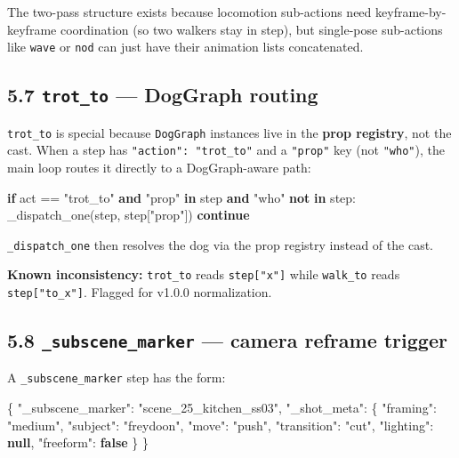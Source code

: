 \documentclass[
  11pt,
]{book}
\newenvironment{Shaded}{}{}
\newcommand{\ControlFlowTok}[1]{\textcolor[rgb]{0.00,0.44,0.13}{\textbf{#1}}}
\newcommand{\DataTypeTok}[1]{\textcolor[rgb]{0.56,0.13,0.00}{#1}}
\newcommand{\FunctionTok}[1]{\textcolor[rgb]{0.02,0.16,0.49}{#1}}
\newcommand{\KeywordTok}[1]{\textcolor[rgb]{0.00,0.44,0.13}{\textbf{#1}}}
\newcommand{\NormalTok}[1]{#1}
\newcommand{\OperatorTok}[1]{\textcolor[rgb]{0.40,0.40,0.40}{#1}}
\newcommand{\StringTok}[1]{\textcolor[rgb]{0.25,0.44,0.63}{#1}}
\begin{document}
The two-pass structure exists because locomotion sub-actions need
keyframe-by-keyframe coordination (so two walkers stay in step), but
single-pose sub-actions like \texttt{wave} or \texttt{nod} can just have
their animation lists concatenated.

\subsection{\texorpdfstring{5.7 \texttt{trot\_to} --- DogGraph
routing}{5.7 trot\_to --- DogGraph routing}}\label{trot_to-doggraph-routing}

\texttt{trot\_to} is special because \texttt{DogGraph} instances live in
the \textbf{prop registry}, not the cast. When a step has
\texttt{"action":\ "trot\_to"} and a \texttt{"prop"} key (not
\texttt{"who"}), the main loop routes it directly to a DogGraph-aware
path:

\begin{Shaded}
\begin{Highlighting}[]
\ControlFlowTok{if}\NormalTok{ act }\OperatorTok{==} \StringTok{"trot\_to"} \KeywordTok{and} \StringTok{"prop"} \KeywordTok{in}\NormalTok{ step }\KeywordTok{and} \StringTok{"who"} \KeywordTok{not} \KeywordTok{in}\NormalTok{ step:}
\NormalTok{    \_dispatch\_one(step, step[}\StringTok{"prop"}\NormalTok{])}
    \ControlFlowTok{continue}
\end{Highlighting}
\end{Shaded}

\texttt{\_dispatch\_one} then resolves the dog via the prop registry
instead of the cast.

\textbf{Known inconsistency:} \texttt{trot\_to} reads
\texttt{step{[}"x"{]}} while \texttt{walk\_to} reads
\texttt{step{[}"to\_x"{]}}. Flagged for v1.0.0 normalization.

\subsection{\texorpdfstring{5.8 \texttt{\_subscene\_marker} --- camera
reframe
trigger}{5.8 \_subscene\_marker --- camera reframe trigger}}\label{subscene_marker-camera-reframe-trigger}

A \texttt{\_subscene\_marker} step has the form:

\begin{Shaded}
\begin{Highlighting}[]
\FunctionTok{\{}
  \DataTypeTok{"\_subscene\_marker"}\FunctionTok{:} \StringTok{"scene\_25\_kitchen\_ss03"}\FunctionTok{,}
  \DataTypeTok{"\_shot\_meta"}\FunctionTok{:} \FunctionTok{\{}
    \DataTypeTok{"framing"}\FunctionTok{:}    \StringTok{"medium"}\FunctionTok{,}
    \DataTypeTok{"subject"}\FunctionTok{:}    \StringTok{"freydoon"}\FunctionTok{,}
    \DataTypeTok{"move"}\FunctionTok{:}       \StringTok{"push"}\FunctionTok{,}
    \DataTypeTok{"transition"}\FunctionTok{:} \StringTok{"cut"}\FunctionTok{,}
    \DataTypeTok{"lighting"}\FunctionTok{:}   \KeywordTok{null}\FunctionTok{,}
    \DataTypeTok{"freeform"}\FunctionTok{:}   \KeywordTok{false}
  \FunctionTok{\}}
\FunctionTok{\}}
\end{Highlighting}
\end{Shaded}
\end{document}
